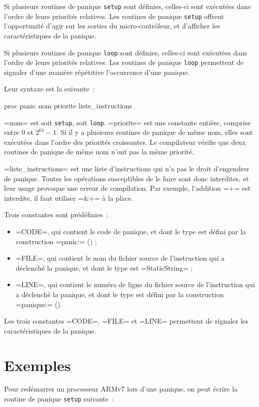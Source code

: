 Si plusieurs routines de panique \texttt{setup} sont définies, celles-ci sont exécutées dans l'ordre de leurs priorités relatives. Les routines de panique \texttt{setup} offrent l'opportunité d'agir sur les sorties du micro-contrôleur, et d'afficher les caractéristiques de la panique.

Si plusieurs routines de panique \texttt{loop} sont définies, celles-ci sont exécutées dans l'ordre de leurs priorités relatives. Les routines de panique \texttt{loop} permettent de signaler d'une manière répétitive l'occurrence d'une panique.


Leur syntaxe est la suivante~:
\begin{PLM}
proc panic nom priorite {
  liste_instructions
}
\end{PLM}

\plm=nom= est soit \texttt{setup}, soit \texttt{loop}. \plm=priorite= est une constante entière, comprise entre $0$ et $2^{64}-1$. Si il y a plusieurs routines de panique de même nom, elles sont exécutées dans l'ordre des priorités croissantes. Le compilateur vérifie que deux routines de panique de même nom n'ont pas la même priorité.

\plm=liste_instructions= est une liste d'instructions qui n'a pas le droit d'engendrer de panique. Toutes les opérations susceptibles de le faire sont donc interdites, et leur usage provoque une erreur de compilation. Par exemple, l'addition \plm=+= est interdite, il faut utiliser \plm=&+= à la place.

Trois constantes sont prédéfinies~:
\begin{itemize}
  \item \plm=CODE=, qui contient le code de panique, et dont le type est défini par la construction \plm=panic:= () ;
  \item \plm=FILE=, qui contient le nom du fichier source de l'instruction qui a déclenché la panique, et dont le type est \plm=StaticString= ;
  \item \plm=LINE=, qui contient le numéro de ligne du fichier source de l'instruction qui a déclenché la panique, et dont le type est défini par la construction \plm=panique:= ().
\end{itemize}

Les trois constantes \plm=CODE=, \plm=FILE= et \plm=LINE= permettent de signaler les caractéristiques de la panique.


\section{Exemples}

Pour redémarrer un processeur ARMv7 lors d'une panique, on peut écrire la routine de panique \texttt{setup} suivante~:
